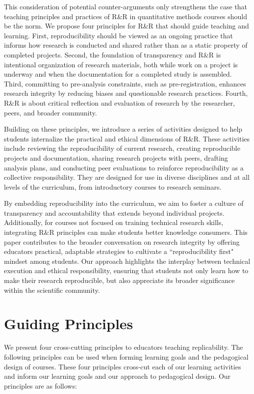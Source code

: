 \documentclass[
  12pt]{article}
\begin{document}
This consideration of potential counter-arguments only strengthens the case that teaching principles and practices of R\&R in quantitative methods courses should be the norm.
We propose four principles for R\&R that should guide teaching and learning. 
First, reproducibility should be viewed as an ongoing practice that informs how research is conducted and shared rather than as a static property of completed projects.  
Second, the foundation of transparency and R\&R is intentional organization of research materials, both while work on a project is underway and when the documentation for a completed study is assembled.
Third, committing to pre-analysis constraints, such as pre-registration, enhances research integrity by reducing biases and questionable research practices.
Fourth, R\&R is about critical reflection and evaluation of research by the researcher, peers, and broader community.

Building on these principles, we introduce a series of activities designed to help students internalize the practical and ethical dimensions of R\&R.
These activities include reviewing the reproducibility of current research, creating reproducible projects and documentation, sharing research projects with peers, drafting analysis plans, and conducting peer evaluations to reinforce reproducibility as a collective responsibility.
They are designed for use in diverse disciplines and at all levels of the curriculum, from introductory courses to research seminars. 

By embedding reproducibility into the curriculum, we aim to foster a culture of transparency and accountability that extends beyond individual projects.
Additionally, for courses not focused on training technical research skills, integrating R\&R principles can make students better knowledge consumers.
This paper contributes to the broader conversation on research integrity by offering educators practical, adaptable strategies to cultivate a ``reproducibility first" mindset among students.
Our approach highlights the interplay between technical execution and ethical responsibility, ensuring that students not only learn how to make their research reproducible, but also appreciate its broader significance within the scientific community. 


\section{Guiding Principles} \label{sec-principles}
We present four cross-cutting principles to educators teaching replicability. The following principles can be used when forming learning goals and the pedagogical design of courses. 
These four principles cross-cut each of our learning activities and inform our learning goals and our approach to pedagogical design.
Our principles are as follows:
\end{document}
